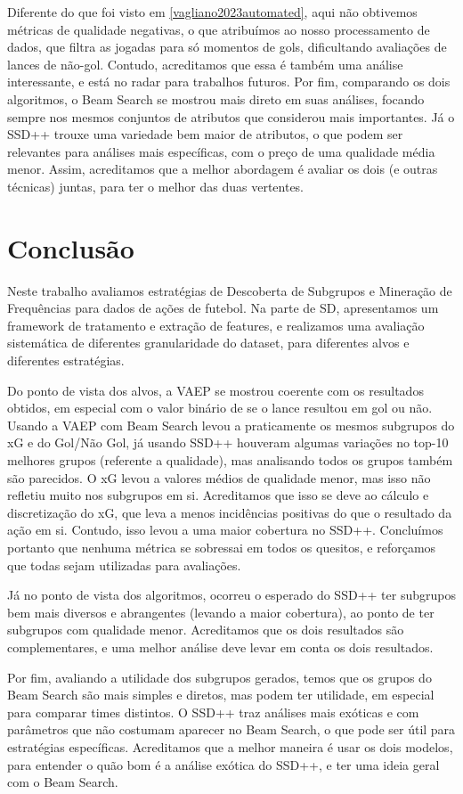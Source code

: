 \documentclass{article}
\begin{document}
Diferente do que foi visto em \ref{vagliano2023automated}, aqui não obtivemos métricas de qualidade negativas, 
o que atribuímos ao nosso processamento de dados, que filtra as jogadas para só momentos de gols, dificultando 
avaliações de lances de não-gol. Contudo, acreditamos que essa é também uma análise interessante, e está no radar 
para trabalhos futuros. Por fim, comparando os dois algoritmos, o Beam Search se mostrou mais direto em suas 
análises, focando sempre nos mesmos conjuntos de atributos que considerou mais importantes. Já o SSD++ trouxe 
uma variedade bem maior de atributos, o que podem ser relevantes para análises mais específicas, com o preço de 
uma qualidade média menor. Assim, acreditamos que a melhor abordagem é avaliar os dois (e outras técnicas) juntas, 
para ter o melhor das duas vertentes.

\section{Conclusão}

Neste trabalho avaliamos estratégias de Descoberta de Subgrupos e Mineração de Frequências para dados de ações 
de futebol. Na parte de SD, apresentamos um framework de tratamento e extração de features, e realizamos uma 
avaliação sistemática de diferentes granularidade do dataset, para diferentes alvos e diferentes estratégias.

Do ponto de vista dos alvos, a VAEP se mostrou coerente com os resultados obtidos, em especial com o valor 
binário de se o lance resultou em gol ou não. Usando a VAEP com Beam Search levou a praticamente os mesmos 
subgrupos do xG e do Gol/Não Gol, já usando SSD++ houveram algumas variações no top-10 melhores grupos 
(referente a qualidade), mas analisando todos os grupos também são parecidos. O xG levou a valores médios 
de qualidade menor, mas isso não refletiu muito nos subgrupos em si. Acreditamos que isso se deve ao 
cálculo e discretização do xG, que leva a menos incidências positivas do que o resultado da ação em si. 
Contudo, isso levou a uma maior cobertura no SSD++. Concluímos portanto que nenhuma métrica se sobressai 
em todos os quesitos, e reforçamos que todas sejam utilizadas para avaliações.

Já no ponto de vista dos algoritmos, ocorreu o esperado do SSD++ ter subgrupos bem mais diversos e abrangentes 
(levando a maior cobertura), ao ponto de ter subgrupos com qualidade menor. Acreditamos que os dois resultados 
são complementares, e uma melhor análise deve levar em conta os dois resultados.

Por fim, avaliando a utilidade dos subgrupos gerados, temos que os grupos do Beam Search são mais simples e 
diretos, mas podem ter utilidade, em especial para comparar times distintos. O SSD++ traz análises mais exóticas 
e com parâmetros que não costumam aparecer no Beam Search, o que pode ser útil para estratégias específicas. 
Acreditamos que a melhor maneira é usar os dois modelos, para entender o quão bom é a análise exótica do SSD++, 
e ter uma ideia geral com o Beam Search.

\newpage

\renewcommand{\refname}{Referências Bibliográficas}

\nocite{*}
\end{document}
